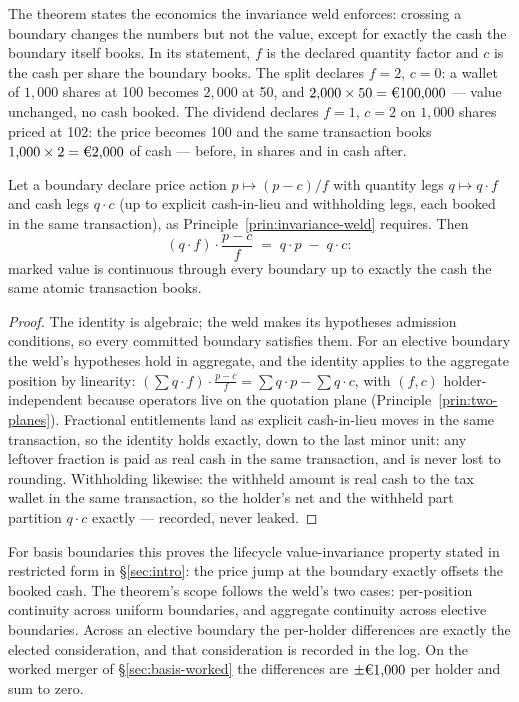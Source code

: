 The theorem states the economics the invariance weld enforces: crossing a boundary
changes the numbers but not the value, except for exactly the cash the boundary
itself books. In its statement, $f$ is the declared quantity factor and $c$ is the
cash per share the boundary books. The split declares $f=2$, $c=0$: a wallet of
$1{,}000$ shares at 100 becomes $2{,}000$ at 50, and
$2{,}000\times50=\EUR{100{,}000}$ --- value unchanged, no cash booked. The dividend
declares $f=1$, $c=2$ on $1{,}000$ shares priced at 102: the price becomes 100 and
the same transaction books $1{,}000\times2=\EUR{2{,}000}$ of cash ---
 before,  in shares and  in cash after.

\begin{theorem}
\label{thm:basis-value-invariance}
Let a boundary declare price action $p\mapsto(p-c)/f$ with quantity legs
$q\mapsto q\cdot f$ and cash legs $q\cdot c$ (up to explicit cash-in-lieu and
withholding legs, each booked in the same transaction), as
Principle~\ref{prin:invariance-weld} requires. Then
\[
(q\cdot f)\cdot\frac{p-c}{f} \;=\; q\cdot p \;-\; q\cdot c :
\]
marked value is continuous through every boundary up to exactly the cash the same atomic
transaction books.
\end{theorem}

\begin{proof}
The identity is algebraic; the weld makes its hypotheses admission conditions, so every
committed boundary satisfies them. For an elective boundary the weld's hypotheses hold
in aggregate, and the identity applies to the aggregate position by linearity:
$(\sum q\cdot f)\cdot\frac{p-c}{f}=\sum q\cdot p-\sum q\cdot c$, with $(f,c)$
holder-independent because operators live on the quotation plane
(Principle~\ref{prin:two-planes}). Fractional entitlements land as explicit cash-in-lieu
moves in the same transaction, so the identity holds exactly, down to the last minor unit: any leftover fraction is
paid as real cash in the same transaction, and is never lost to rounding.
Withholding likewise: the withheld amount is real cash to the tax wallet in
the same transaction, so the holder's net and the withheld part partition
$q\cdot c$ exactly --- recorded, never leaked.
\end{proof}

\noindent
For basis boundaries this proves the lifecycle value-invariance property stated in
restricted form in \S\ref{sec:intro}: the price jump at the boundary exactly offsets
the booked cash. The theorem's scope follows the weld's two cases: per-position
continuity across uniform boundaries, and aggregate continuity across elective
boundaries. Across an elective boundary the per-holder differences are exactly
the elected consideration, and that consideration is recorded in the log. On
the worked merger of \S\ref{sec:basis-worked} the differences are
$\pm\EUR{1{,}000}$ per holder and sum to zero.

